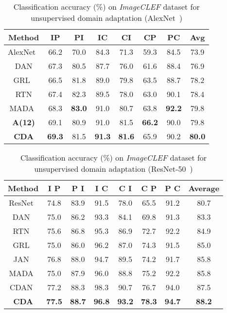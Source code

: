 \documentclass{bmvc2k}
\begin{document}
\begin{table*}[!h]
\centering
\begin{tabular}{ |c|c|c|c|c|c|c|c| }
 \hline
  \textbf{Method }& IP & PI &  IC &CI & CP & PC & Avg \\ 
 \hline
AlexNet~\cite{krizhevsky_NIPS2012} & 66.2 & 70.0 & 84.3 & 71.3 & 59.3 &84.5 & 73.9  \\
DAN\cite{long_ICML2015} & 67.3 & 80.5 & 87.7 & 76.0 & 61.6 & 88.4 & 76.9  \\
GRL~\cite{ganin_ICML2015} & 66.5 & 81.8 & 89.0 & 79.8 &63.5 &88.7 &78.2  \\
RTN\cite{long_NIPS2016} & 67.4 & 82.3 &89.5 & 78.0 &63.0 &90.1 &78.4  \\
MADA~\cite{pei_arxiv2018} & 68.3 &\textbf{83.0} &91.0 &80.7 &63.8 & \textbf{92.2} &79.8  \\
\hline
\textbf{A(12)} & {69.1} & {80.9} &  {91.0} & {81.5} &  \textbf{66.2}  &  {90.0} & {79.8} \\
 \hline
 \textbf{CDA}&\textbf{69.3}& 81.5 & \textbf{91.3} &\textbf{ 81.6} &{ 65.9} & {{90.2}} & \textbf{80.0}\\ 
 \hline
\end{tabular}
\vspace{1em}
\caption {Classification accuracy (\%) on \textit{ImageCLEF} dataset for unsupervised domain adaptation (AlexNet~\cite{krizhevsky_NIPS2012})\label{tbl:imageclef}} 
 \end{table*}

\begin{table*}[!]
\centering
\begin{tabular}{|c|c|c|c|c|c|c|c|}
 \hline
  \textbf{Method }& I  P & P I &  I  C &C  I & C  P & P  C & Average \\ 
  \hline
ResNet~\cite{he2016deep} & 74.8 & 83.9 & 91.5 & 78.0 & 65.5 & 91.2 & 80.7 \\
DAN~\cite{long_ICML2015} & 75.0 & 86.2 & 93.3 & 84.1 & 69.8 & 91.3 & 83.3 \\
RTN~\cite{long_NIPS2016} & 75.6 & 86.8 & 95.3 & 86.9 & 72.7 & 92.2 & 84.9 \\
GRL~\cite{ganin_ICML2015} & 75.0 & 86.0 & 96.2 & 87.0 & 74.3 & 91.5 & 85.0 \\
JAN~\cite{long_ICML2017} & 76.8 & 88.0 &94.7 & 89.5 & 74.2 & 91.7 & 85.8 \\ 
MADA~\cite{pei_arxiv2018} & 75.0 & 87.9 & {96.0} & 88.8 & 75.2 & 92.2 & 85.8 \\
CDAN~\cite{long_arxive2017conditional} & 77.2 & 88.3 & 98.3 & 90.7 & 76.7 & 94.0 & 87.5  \\
 \hline
\textbf{CDA} & \textbf{77.5} & \textbf{88.7} & \textbf{96.8} & \textbf{93.2} &  \textbf{78.3}  &  \textbf{94.7} & \textbf{88.2} \\
 \hline

\end{tabular}
\vspace{1em}
\caption {Classification accuracy (\%) on \textit{ImageCLEF} dataset for unsupervised domain adaptation (ResNet-50~\cite{he2016deep})\label{tbl:imageclef_res}} 

\end{table*}
\end{document}
